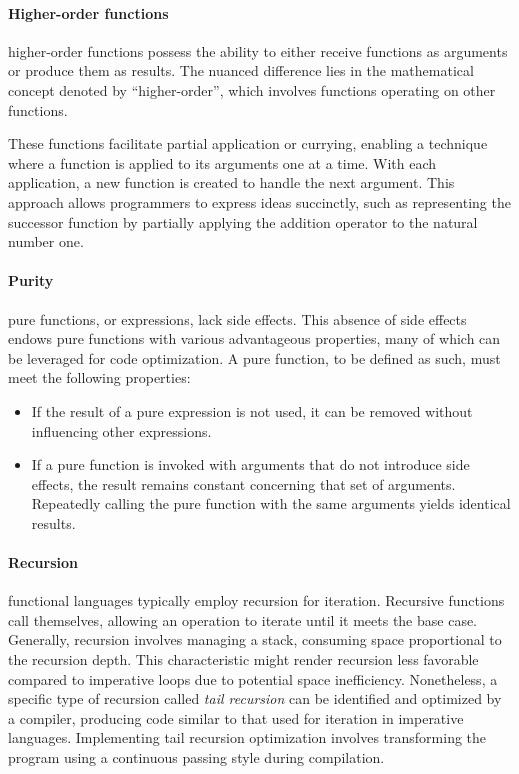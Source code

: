 \paragraph{Higher-order functions}

higher-order functions possess the ability to either receive functions as arguments or produce them as results. The nuanced difference lies in the mathematical concept denoted by ``higher-order'', which involves functions operating on other functions.

These functions facilitate partial application or currying, enabling a technique where a function is applied to its arguments one at a time. With each application, a new function is created to handle the next argument. This approach allows programmers to express ideas succinctly, such as representing the successor function by partially applying the addition operator to the natural number one.

\paragraph{Purity}

pure functions, or expressions, lack side effects. This absence of side effects endows pure functions with various advantageous properties, many of which can be leveraged for code optimization. A pure function, to be defined as such, must meet the following properties:

\begin{itemize}
    \item If the result of a pure expression is not used, it can be removed without influencing other expressions.
    \item If a pure function is invoked with arguments that do not introduce side effects, the result remains constant concerning that set of arguments. Repeatedly calling the pure function with the same arguments yields identical results.
\end{itemize}

\paragraph{Recursion}

functional languages typically employ recursion for iteration. Recursive functions call themselves, allowing an operation to iterate until it meets the base case. Generally, recursion involves managing a stack, consuming space proportional to the recursion depth. This characteristic might render recursion less favorable compared to imperative loops due to potential space inefficiency. Nonetheless, a specific type of recursion called \textit{tail recursion} can be identified and optimized by a compiler, producing code similar to that used for iteration in imperative languages. Implementing tail recursion optimization involves transforming the program using a continuous passing style during compilation.

